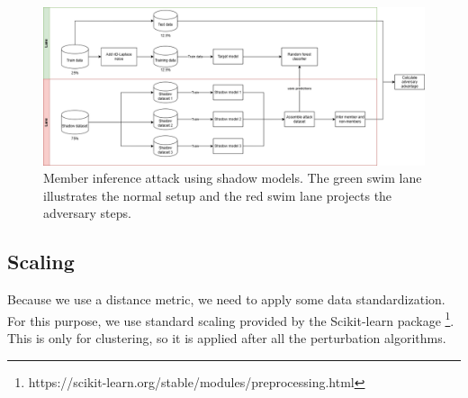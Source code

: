 \begin{figure}[H]
  \includegraphics[width=1\textwidth]{Method/images/MI-setup.png}
  \caption{Member inference attack using shadow models. The green swim lane illustrates the normal setup and the red swim lane projects the adversary steps.}
  \label{figure:mi-attack}
\end{figure}
\subsection{Scaling}
Because we use a distance metric, we need to apply some data standardization.
For this purpose, we use standard scaling provided by the Scikit-learn package \footnote{https://scikit-learn.org/stable/modules/preprocessing.html}.
This is only for clustering, so it is applied after all the perturbation algorithms.

